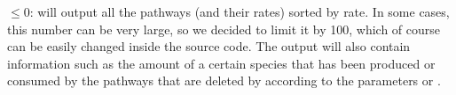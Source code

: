  $\leq 0$: \pump{} will output all the pathways (and their rates) sorted by rate. In some cases, this number can be very large, so we decided to limit it by 100, which of course can be easily changed inside the \pump{} source code. The output will also contain information such as the amount of a certain species that has been produced or consumed by the pathways that are deleted by \pump{} according to the parameters  or . 













